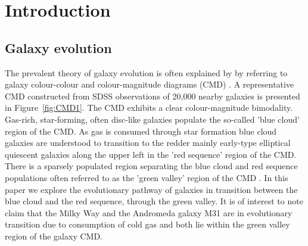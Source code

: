 \section{Introduction}
\label{sec:introduction}

% 

\subsection{Galaxy evolution}
\label{sec:evolution}

The prevalent theory of galaxy evolution is often explained  by  by referring to galaxy colour-colour and colour-magnitude diagrams (CMD) \citep[see e.g.][]{2001AJ....122.1861S, 2003ApJ...585L...5H, 2003ApJS..149..289B,baldry2004quantifying,2006MNRAS.373..469B}. A representative CMD constructed from SDSS observations of 20,000 nearby galaxies is presented in  Figure~\ref{fig:CMD1}. The CMD exhibits a clear colour-magnitude bimodality.  Gas-rich, star-forming, often disc-like galaxies populate the so-called 'blue cloud' region of the CMD. As gas is consumed through star formation blue cloud galaxies are understood to transition to the redder mainly early-type elliptical quiescent galaxies along the upper left in the 'red sequence' region of the CMD. There is a sparsely populated region separating the blue cloud and red sequence populations often referred to as the 'green valley' region of the CMD  \citep{2004ApJ...608..752B}. In this paper we explore the evolutionary pathway of galaxies in transition between the blue cloud and the red sequence, through the green valley.
It is of interest to note \citet{Mutch_2011} claim that the Milky Way and the Andromeda galaxy M31 are in evolutionary transition due to consumption of cold gas and both lie within the green valley region of the galaxy CMD.

